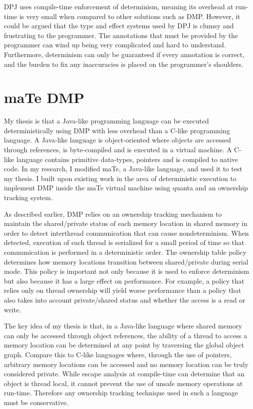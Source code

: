 DPJ uses compile-time enforcement of determinism, meaning its overhead
at run-time is very small when compared to other solutions such as
DMP.  However, it could be argued that the type and effect systems
used by DPJ is clumsy and frustrating to the programmer.  The
annotations that must be provided by the programmer can wind up being
very complicated and hard to understand.  Furthermore, determinism can
only be guaranteed if every annotation is correct, and the burden to
fix any inaccuracies is placed on the programmer's shoulders.

\section{maTe DMP}

My thesis is that a Java-like programming language can be executed
deterministically using DMP with less overhead than a C-like
programming language.  A Java-like language is object-oriented where
objects are accessed through references, is byte-compiled and is
executed in a virtual machine.  A C-like language contains primitive
data-types, pointers and is compiled to native code.  In my research,
I modified maTe, a Java-like language, and used it to test my thesis.
I built upon existing work in the area of deterministic execution to
implement DMP inside the maTe virtual machine using quanta and an
ownership tracking system.

As described earlier, DMP relies on an ownership tracking mechanism to
maintain the shared/private status of each memory location in shared
memory in order to detect interthread communication that can cause
nondeterminism.  When detected, execution of each thread is serialized
for a small period of time so that communication is performed in a
deterministic order.  The ownership table policy determines how memory
locations transition between shared/private during serial mode.  This
policy is important not only because it is used to enforce determinism
but also because it has a large effect on performance.  For example, a
policy that relies only on thread ownership will yield worse
performance than a policy that also takes into account private/shared
status and whether the access is a read or write.

The key idea of my thesis is that, in a Java-like language where
shared memory can only be accessed through object references, the
ability of a thread to access a memory location can be determined at
any point by traversing the global object graph.  Compare this to
C-like languages where, through the use of pointers, arbitrary memory
locations can be accessed and no memory location can be truly
considered private.  While escape analysis at compile-time can
determine that an object is thread local, it cannot prevent the use of
unsafe memory operations at run-time.  Therefore any ownership
tracking technique used in such a language must be conservative.

